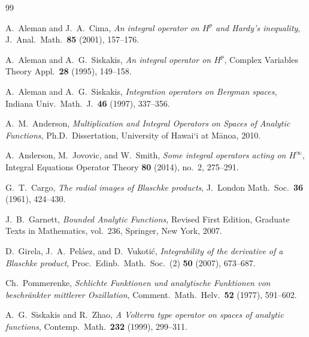 \documentclass[11pt,reqno]{amsart}
\numberwithin{equation}{section}
\begin{document}
\begin{thebibliography}{99}

 A.~Aleman and J.~A.~Cima, {\em An integral operator on $H^p$ and Hardy's inequality}, J.\ Anal.\ Math.\ \textbf{85} (2001), 157--176.

 A.~Aleman and A.~G.~Siskakis, {\em An integral operator on $H^p$}, Complex Variables Theory Appl.\ \textbf{28} (1995), 149--158.

 A.~Aleman and A.~G.~Siskakis, {\em Integration operators on Bergman spaces}, Indiana Univ.\ Math.\ J.\ \textbf{46} (1997), 337--356.

 A.~M.~Anderson, {\em Multiplication and Integral Operators on Spaces of Analytic Functions}, Ph.D.\ Dissertation, University of Hawai`i at M\=anoa, 2010.

 A.~Anderson, M.~Jovovic, and W.~Smith, {\em Some integral operators acting on $H^\infty$}, Integral Equations Operator Theory \textbf{80} (2014), no.~2, 275--291.

 G.~T.~Cargo, {\em The radial images of Blaschke products}, J.\ London Math.\ Soc.\ \textbf{36} (1961), 424--430.

 J.~B.~Garnett, {\em Bounded Analytic Functions}, Revised First Edition, Graduate Texts in Mathematics, vol.~236, Springer, New York, 2007.

 D.~Girela, J.~A.~Pel\'aez, and D.~Vukoti\'c, {\em Integrability of the derivative of a Blaschke product}, Proc.\ Edinb.\ Math.\ Soc.\ (2) \textbf{50} (2007), 673--687.

 Ch.~Pommerenke, {\em Schlichte Funktionen und analytische Funktionen von beschr\"ankter mittlerer Oszillation}, Comment.\ Math.\ Helv.\ \textbf{52} (1977), 591--602.

 A.~G.~Siskakis and R.~Zhao, {\em A Volterra type operator on spaces of analytic functions}, Contemp.\ Math.\ \textbf{232} (1999), 299--311.

\end{thebibliography}
\end{document}
